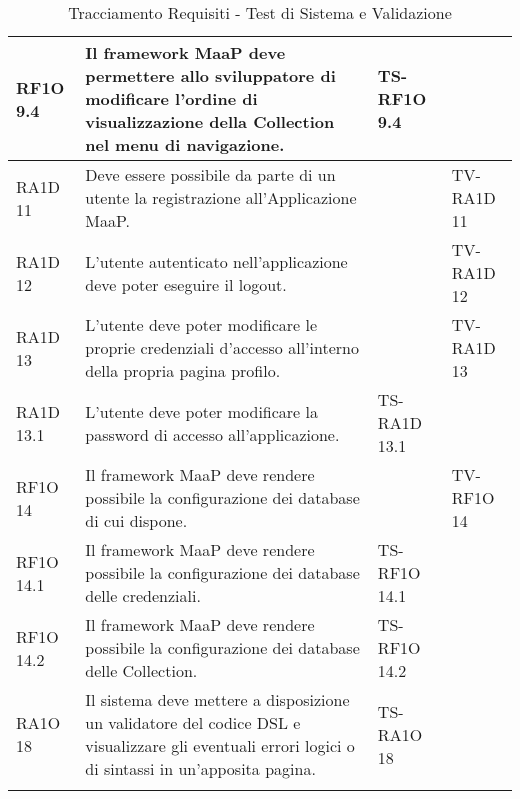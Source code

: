 \begin{center}
\begin{longtable}{| p{2cm} | p{6cm} | p{2.5cm} | p{2.5cm} | }
					RF1O 9.4 & 
					Il framework MaaP deve permettere allo sviluppatore di modificare l’ordine di visualizzazione della Collection nel menu di navigazione. & TS-RF1O 9.4 & \\ \hline 
					RA1D 11 & 
					Deve essere possibile da parte di un utente la registrazione all’Applicazione MaaP. &  & TV-RA1D 11 \\ \hline 
					RA1D 12 & 
					L’utente autenticato nell’applicazione deve poter eseguire il logout. &  & TV-RA1D 12 \\ \hline 
					RA1D 13 & 
					L'utente deve poter modificare le proprie credenziali d'accesso all'interno della propria pagina profilo. &  & TV-RA1D 13 \\ \hline 
					RA1D 13.1 & 
					L’utente deve poter modificare la password di accesso all’applicazione. & TS-RA1D 13.1 & \\ \hline 
					RF1O 14 & 
					Il framework MaaP deve rendere possibile la configurazione dei database di cui dispone. &  & TV-RF1O 14 \\ \hline 
					RF1O 14.1 & 
					Il framework MaaP deve rendere possibile la configurazione dei database delle credenziali. & TS-RF1O 14.1 & \\ \hline 
					RF1O 14.2 & 
					Il framework MaaP deve rendere possibile la configurazione dei database delle Collection. & TS-RF1O 14.2 & \\ \hline 
					RA1O 18 & 
					Il sistema deve mettere a disposizione un validatore del codice DSL e visualizzare gli eventuali errori logici o di sintassi in un'apposita pagina. & TS-RA1O 18 & \\ \hline 
		\caption{Tracciamento Requisiti - Test di Sistema e Validazione}
		\end{longtable}
	 \egroup
\end{center}
\clearpage
